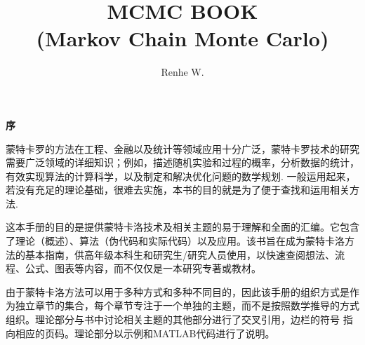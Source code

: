 \documentclass[a4paper,UTF-8,12pt]{ctexbook}
\title{MCMC BOOK\\ (Markov Chain Monte Carlo)}
\author{Renhe W.}
\date{}
\numberwithin{equation}{chapter}
\renewcommand{\proofname}{\indent\bf 证明}
\newcommand{\prefacename}{序}
\newenvironment{preface}{
		\vspace*{\stretch{2}}
		{\noindent \bfseries \Huge \prefacename}
		\begin{center}
			\thispagestyle{plain}
		\end{center}%
	}
	{\vspace*{\stretch{5}}}
\begin{document}
		\renewcommand{\proofname}{\indent\bf 证明}
		\renewcommand{\qedsymbol}{$\blacksquare$}    %
		\maketitle
		\thispagestyle{empty}%
		\pagestyle{empty}
		
		
		\frontmatter
		
		\begin{preface}
			\quad 蒙特卡罗的方法在工程、金融以及统计等领域应用十分广泛，蒙特卡罗技术的研究需要广泛领域的详细知识；例如，描述随机实验和过程的{\color{brown}概率}，分析数据的{\color{brown}统计}，有效实现算法的{\color{brown}计算科学}，以及制定和解决优化问题的{\color{brown}数学规划}. 一般运用起来，若没有充足的理论基础，很难去实施，本书的目的就是为了便于查找和运用相关方法.
			
			这本手册的目的是提供蒙特卡洛技术及相关主题的易于理解和全面的汇编。它包含了{\color{brown}理论（概述）}、{\color{brown}算法（伪代码和实际代码）}以及{\color{brown}应用}。该书旨在成为蒙特卡洛方法的基本指南，供高年级本科生和研究生/研究人员使用，以快速查阅想法、流程、公式、图表等内容，而不仅仅是一本研究专著或教材。
			
			由于蒙特卡洛方法可以用于多种方式和多种不同目的，因此该手册的组织方式是作为独立章节的集合，每个章节专注于一个单独的主题，而不是按照数学推导的方式组织。理论部分与书中讨论相关主题的其他部分进行了交叉引用，边栏的符号 \HandRight 指向相应的页码。理论部分以示例和MATLAB代码进行了说明。
			
		\end{preface}
		
		
		\clearpage
		
		\tableofcontents
		
		\clearpage
		\listoffigures
		
		\clearpage
		\listoftables
		
		
		
		\mainmatter
	
	
		
		
\end{document}
